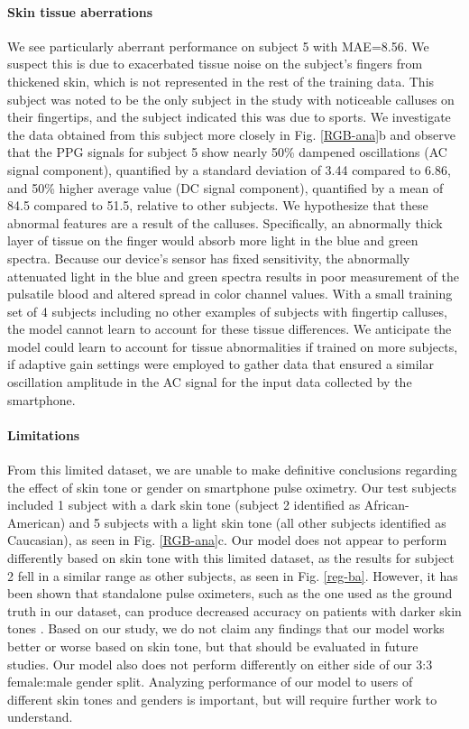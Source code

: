 \documentclass[12pt]{article}
\begin{document}
\paragraph*{Skin tissue aberrations}
We see particularly aberrant performance
on subject 5 with MAE=8.56. We suspect this is due to exacerbated tissue noise on the subject's fingers from thickened skin, which is not represented in the rest of the training data. This subject was noted to be the only subject in the study with noticeable calluses on their fingertips, and the subject indicated this was due to sports. We investigate the data obtained from this subject more closely in Fig. \ref{RGB-ana}b and observe that the PPG signals for subject 5 show nearly 50\% dampened oscillations (AC signal component), quantified by a standard deviation of 3.44 compared to 6.86, and 50\% higher average value (DC signal component), quantified by a mean of 84.5 compared to 51.5, relative to other subjects.
We hypothesize that these abnormal features are a result of the calluses. Specifically, an abnormally thick layer of tissue on the finger would absorb more light in the blue and green spectra. Because our device's sensor has fixed sensitivity, the abnormally attenuated light in the blue and green spectra results in poor measurement of the pulsatile blood and altered spread in color channel values.
With a small training set of 4 subjects including no other examples of subjects with fingertip calluses, the model cannot learn to account for these tissue differences. We anticipate the model could learn to account for tissue abnormalities if trained on more subjects, if adaptive gain settings were employed to gather data that ensured a similar oscillation amplitude in the AC signal for the input data collected by the smartphone.

\paragraph*{Limitations}
From this limited dataset, we are unable to make definitive conclusions regarding the effect of skin tone or gender on smartphone pulse oximetry. Our test subjects included 1 subject with a dark skin tone (subject 2 identified as African-American) and 5 subjects with a light skin tone (all other subjects identified as Caucasian), as seen in Fig. \ref{RGB-ana}c. Our model does not appear to perform differently based on skin tone with this limited dataset, as the results for subject 2 fell in a similar range as other subjects, as seen in Fig. \ref{reg-ba}. However, it has been shown that standalone pulse oximeters, such as the one used as the ground truth in our dataset, can produce decreased accuracy on patients with darker skin tones \cite{feiner2007dark}.  Based on our study, we do not claim any findings that our model works better or worse based on skin tone, but that should be evaluated in future studies.  Our model also does not perform differently on either side of our 3:3 female:male gender split. Analyzing performance of our model to users of different skin tones and genders is important, but will require further work to understand.
\end{document}
